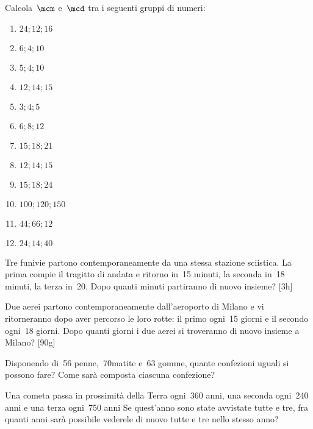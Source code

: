 \begin{esercizio}[*]
Calcola~\(\mcm\) e~\(\mcd\) tra i seguenti gruppi di numeri:
\begin{multicols}{4}
 \begin{enumerate}[noitemsep, label=(\alph*)]
 \item \(24; 12; 16\)
 \item \(6; 4; 10\)
 \item \(5; 4; 10\)
 \item \(12; 14; 15\)
 \item \(3; 4; 5\)
 \item \(6; 8; 12\)
 \item \(15; 18; 21\)
 \item \(12; 14; 15\)
 \item \(15; 18; 24\)
 \item \(100; 120; 150\)
 \item \(44; 66; 12\)
 \item \(24; 14; 40\)
 \end{enumerate}
\end{multicols}
\end{esercizio}

\begin{multicols}{2}
\begin{esercizio}[*]
 Tre funivie partono contemporaneamente da una stessa stazione sciistica. La 
prima compie il tragitto di
andata e ritorno in~15 minuti, la seconda in~18 minuti, la terza in~20. Dopo 
quanti minuti partiranno di nuovo
insieme? \hfill[3h]
\end{esercizio}

\begin{esercizio}[*]
 Due aerei partono contemporaneamente dall'aeroporto di Milano e vi 
ritorneranno dopo aver
percorso le loro rotte: il primo ogni~15 giorni e il secondo ogni~18 giorni. 
Dopo quanti giorni i due
aerei si troveranno di nuovo insieme a Milano? \hfill[90g]
\end{esercizio}

\begin{esercizio}
 Disponendo di~56 penne,~70matite e~63 gomme, quante confezioni uguali si 
possono fare? Come sarà
composta ciascuna confezione?
\end{esercizio}

\begin{esercizio}
 Una cometa passa in prossimità della Terra ogni~360 anni, una seconda 
ogni~240 anni e una terza ogni~750 anni
 Se quest'anno sono state avvistate tutte e tre, fra quanti anni sarà 
possibile vederele di nuovo tutte e
tre nello stesso anno?
\end{esercizio}
\end{multicols}


